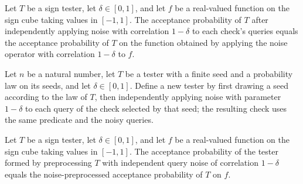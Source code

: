 \begin{theorem}
\label{FABL.SignTester.noisePreprocessedAcceptanceProbability_eq_noiseOperator}
\leanok
{}
Let $T$ be a sign tester, let $\delta\in[0,1]$, and let $f$ be a real-valued function on
the sign cube taking values in $[-1,1]$. The acceptance probability of $T$ after
independently applying noise with correlation $1-\delta$ to each check's queries equals
the acceptance probability of $T$ on the function obtained by applying the noise
operator with correlation $1-\delta$ to $f$.
\end{theorem}

\begin{definition}
\label{FABL.SignTester.noisePreprocessed}
\leanok
{}
Let $n$ be a natural number, let $T$ be a tester with a finite seed and a probability
law on its seeds, and let $\delta\in[0,1]$. Define a new tester by first drawing a seed
according to the law of $T$, then independently applying noise with parameter $1-\delta$
to each query of the check selected by that seed; the resulting check uses the same
predicate and the noisy queries.
\end{definition}

\begin{theorem}
\label{FABL.SignTester.noisePreprocessed_acceptanceProbability}
\leanok
{}
Let $T$ be a sign tester, let $\delta\in[0,1]$, and let $f$ be a real-valued function on
the sign cube taking values in $[-1,1]$. The acceptance probability of the tester formed
by preprocessing $T$ with independent query noise of correlation $1-\delta$ equals the
noise-preprocessed acceptance probability of $T$ on $f$.
\end{theorem}

